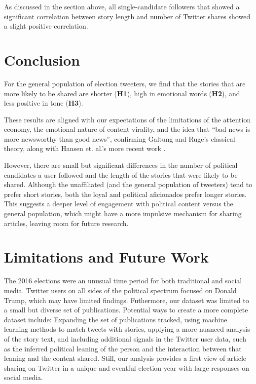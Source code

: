 \documentclass[letterpaper]{article}
\begin{document}
As discussed in the section above, all single-candidate followers that showed a significant correlation between story length and number of Twitter shares showed a slight positive correlation.

\section{Conclusion}
For the general population of election tweeters, we find that the stories that are more likely to be shared are shorter (\textbf{H1}), high in emotional words (\textbf{H2}), and less positive in tone (\textbf{H3}).

These results are aligned with our expectations of the limitations of the attention economy, the emotional nature of content virality, and the idea that ``bad news is more newsworthy than good news'', confirming Galtung and Ruge's classical theory, along with Hansen et. al.'s more recent work \cite{galtung1965structure,hansen2011good}.

However, there are small but significant differences in the number of political candidates a user followed and the length of the stories that were likely to be shared. Although the unaffiliated (and the general population of tweeters) tend to prefer short stories, both the loyal and political aficionados prefer longer stories. This suggests a deeper level of engagement with political content versus the general population, which might have a more impulsive mechanism for sharing articles, leaving room for future research.

\section{Limitations and Future Work}  
The 2016 elections were an unusual time period for both traditional and social media. Twitter users on all sides of the political spectrum focused on Donald Trump, which may have limited findings. Futhermore, our dataset was limited to a small but diverse set of publications. Potential ways to create a more complete dataset include: Expanding the set of publications tracked, using machine learning methods to match tweets with stories, applying a more nuanced analysis of the story text, and including additional signals in the Twitter user data, such as the inferred political leaning of the person and the interaction between that leaning and the content shared. Still, our analysis provides a first view of article sharing on Twitter in a unique and eventful election year with large responses on social media.


 
 
\end{document}
